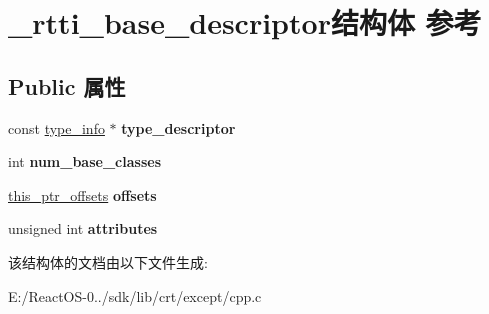\hypertarget{struct__rtti__base__descriptor}{}\section{\+\_\+rtti\+\_\+base\+\_\+descriptor结构体 参考}
\label{struct__rtti__base__descriptor}
\subsection*{Public 属性}
\begin{DoxyCompactItemize}
\item 
\mbox{\label{struct__rtti__base__descriptor_a5fbfb0068511efdb4b6c8180d8d6c8f0}} 
const \hyperlink{struct____type__info}{type\+\_\+info} $\ast$ {\bfseries type\+\_\+descriptor}
\item 
\mbox{\label{struct__rtti__base__descriptor_a4eb1111b19c9f2fa6368758ac46c4c4c}} 
int {\bfseries num\+\_\+base\+\_\+classes}
\item 
\mbox{\label{struct__rtti__base__descriptor_a22c1ebe6b7cdb7319057e384ab7df7ee}} 
\hyperlink{structthis__ptr__offsets}{this\+\_\+ptr\+\_\+offsets} {\bfseries offsets}
\item 
\mbox{\label{struct__rtti__base__descriptor_a713fcc5d49ae70a0f82563ee5ed5be71}} 
unsigned int {\bfseries attributes}
\end{DoxyCompactItemize}


该结构体的文档由以下文件生成\+:\begin{DoxyCompactItemize}
\item 
E\+:/\+React\+O\+S-\/0../sdk/lib/crt/except/cpp.\+c\end{DoxyCompactItemize}
